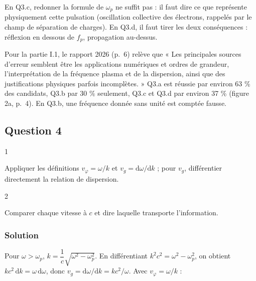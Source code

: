 \documentclass[11pt,a4paper]{article}
\begin{document}
\begin{piege}

En Q3.c, redonner la formule de \(\omega_p\) ne suffit pas : il faut dire ce que représente physiquement cette pulsation (oscillation collective des électrons, rappelés par le champ de séparation de charges). En Q3.d, il faut tirer les deux conséquences : réflexion en dessous de \(f_p\), propagation au-dessus.

\end{piege}

\begin{jury}

Pour la partie I.1, le rapport 2026 (p.~6) relève que « Les principales sources d'erreur semblent être les applications numériques et ordres de grandeur, l'interprétation de la fréquence plasma et de la dispersion, ainsi que des justifications physiques parfois incomplètes. » Q3.a est réussie par environ 63 \% des candidats, Q3.b par 30 \% seulement, Q3.c et Q3.d par environ 37 \% (figure 2a, p.~4). En Q3.b, une fréquence donnée sans unité est comptée fausse.

\end{jury}

\hypertarget{question-4}{%
\subsection{Question 4}\label{question-4}}

\begin{indication}{1}

Appliquer les définitions \(v_\varphi=\omega/k\) et \(v_g=\mathrm d\omega/\mathrm dk\) ; pour \(v_g\), différentier directement la relation de dispersion.

\end{indication}

\begin{indication}{2}

Comparer chaque vitesse à \(c\) et dire laquelle transporte l'information.

\end{indication}

\hypertarget{solution-3}{%
\subsubsection{Solution}\label{solution-3}}

Pour \(\omega>\omega_p\), \(k=\dfrac1c\sqrt{\omega^2-\omega_p^2}\). En différentiant \(k^2c^2=\omega^2-\omega_p^2\), on obtient \(kc^2\,\mathrm dk=\omega\,\mathrm d\omega\), donc \(v_g=\mathrm d\omega/\mathrm dk=kc^2/\omega\). Avec \(v_\varphi=\omega/k\) :
\end{document}
